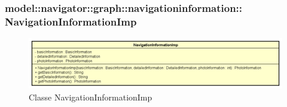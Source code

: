 \documentclass[../DefinizioneDiProdotto.tex]{subfiles}
\begin{document}
\subsubsection[model::navigator::graph::navigationinformation::NavigationInformationImp]{model::navigator::graph::navigationinformation::\\NavigationInformationImp}

    \begin{figure}[H]
        \centering
        \includegraphics{img/NavigationInformationImp.png}
        \caption{Classe NavigationInformationImp}\label{fig:model::navigator::graph::navigationinformation::NavigationInformationImp} 
    \end{figure}
\end{document}
